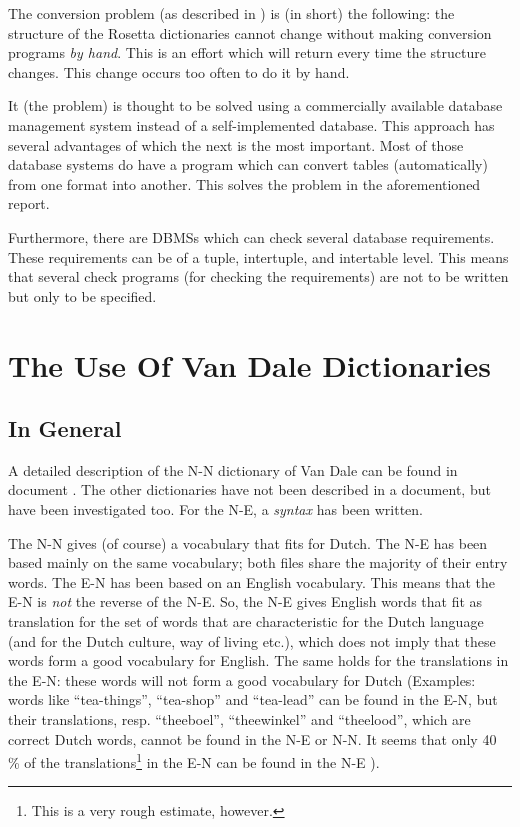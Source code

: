The conversion problem (as described in \cite{ro:conv}) is (in short) the 
following:
the structure of the Rosetta dictionaries cannot change without making 
conversion programs {\em by hand}. This is an effort which will return every 
time the structure changes. This change occurs too often to do it by hand.
 
It (the problem) is thought to be solved using a commercially available 
database management 
system instead of a self-implemented database. This approach has several 
advantages of which the next is the most important. Most of those 
database systems do have a program which can convert tables (automatically)
from one format into another. This solves the problem in the aforementioned 
report. 
 
Furthermore, there are DBMSs which can check several 
database requirements. These requirements can be of a tuple, intertuple, and 
intertable level. This means that several check programs (for checking the 
requirements) are not to be written but only to be specified.
 
\newpage
\section{The Use Of Van Dale Dictionaries}
 
\subsection{In General}
 
A detailed description of the N-N dictionary of Van Dale can be found in 
document \cite{sm:descr}. The other dictionaries have not been described in a
document, but have been investigated too. For the N-E, a {\em syntax} has 
been written.
 
The N-N gives (of course) a vocabulary that fits for Dutch. The N-E has been 
based 
mainly on the same vocabulary; both files share the majority of their entry 
words. The E-N has been based on an English vocabulary. This means that 
the E-N is
{\em not} the reverse of the N-E. So, the N-E gives English words that fit as 
translation for the set of words that are characteristic for the Dutch language
(and for the Dutch culture, way of living etc.), which does not imply that 
these words form a good vocabulary for English. The same holds for the 
translations in the E-N: these words will not form a good vocabulary for Dutch
(Examples: words like ``tea-things'', ``tea-shop'' and ``tea-lead'' can be found
in the E-N, but their translations, resp. ``theeboel'', ``theewinkel'' and 
``theelood'', which are correct Dutch words, cannot be found in the N-E or 
N-N. It seems that only 40 \% of the translations\footnote{This 
is a very rough estimate, however.} in the E-N can be found 
in the N-E ).
 
